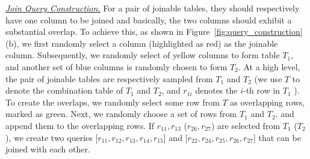 
\noindent \underline{\textit{Join Query Construction.}}  For a pair of joinable tables, they should respectively have one column to be joined and basically, the two columns should  exhibit a substantial  overlap. To achieve this, as shown in Figure~\ref{fig:query_construction}(b), we first randomly select a  column (highlighted as red) as the joinable column. 
Subsequently, we randomly select of yellow columns to form table $T_1$, and another set of blue columns  is randomly chosen to form  $T_2$. At a high level, the pair of joinable tables are respectively sampled from $T_1$ and $T_2$ 
(we use $T$ to denote the combination table of $T_1$ and $T_2$, and $r_{1i}$ denotes the $i$-th row in $T_1$ ).
%
To create the overlaps, we randomly select some row from  $T$ as overlapping rows, marked as green. Next, we  randomly choose a set of rows  from   $T_1$ and  $T_2$, and append them to the overlapping rows.
If $r_{11}, r_{13}$ ($r_{26}, r_{27}$) are selected from $T_1$ ($T_2$), we create two queries [$r_{11}, r_{12}, r_{13}, r_{14}, r_{15}$] and  [$r_{22}, r_{24}, r_{25}, r_{26}, r_{27}$] that can be joined with each other.

